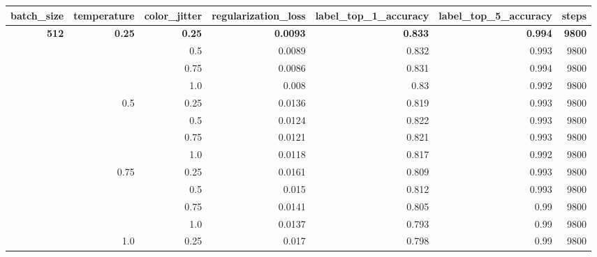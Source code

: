 \begin{table}[H]
\begin{tabular}{rrrrrrr}
batch\_size   & temperature   & color\_jitter & regularization\_loss & label\_top\_1\_accuracy & label\_top\_5\_accuracy & steps         \\ \hline
\textbf{512}  & \textbf{0.25} & \textbf{0.25} & \textbf{0.0093}      & \textbf{0.833}          & \textbf{0.994}          & \textbf{9800} \\
              &               & 0.5           & 0.0089               & 0.832                   & 0.993                   & 9800          \\
              &               & 0.75          & 0.0086               & 0.831                   & 0.994                   & 9800          \\
              &               & 1.0           & 0.008                & 0.83                    & 0.992                   & 9800          \\
              & 0.5           & 0.25          & 0.0136               & 0.819                   & 0.993                   & 9800          \\
              &               & 0.5           & 0.0124               & 0.822                   & 0.993                   & 9800          \\
              &               & 0.75          & 0.0121               & 0.821                   & 0.993                   & 9800          \\
              &               & 1.0           & 0.0118               & 0.817                   & 0.992                   & 9800          \\
              & 0.75          & 0.25          & 0.0161               & 0.809                   & 0.993                   & 9800          \\
              &               & 0.5           & 0.015                & 0.812                   & 0.993                   & 9800          \\
              &               & 0.75          & 0.0141               & 0.805                   & 0.99                    & 9800          \\
              &               & 1.0           & 0.0137               & 0.793                   & 0.99                    & 9800          \\
              & 1.0           & 0.25          & 0.017                & 0.798                   & 0.99                    & 9800          \\

\end{tabular}
\end{table}
